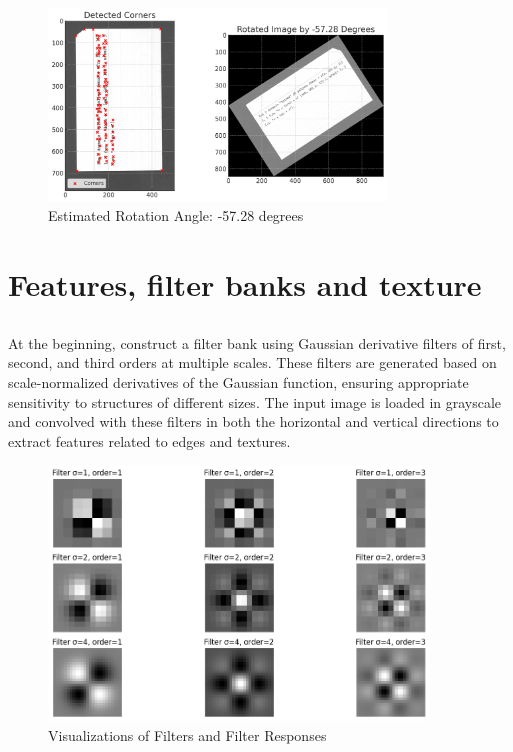 \documentclass[12pt]{article}
\begin{document}

\begin{figure}[h]
    \centering
    \includegraphics[width=0.8\textwidth]{pics/a6-2.1.png} 
    \caption{Estimated Rotation Angle: -57.28 degrees}
    \label{rot}
\end{figure}


\section{Features, filter banks and texture}
    \subsection{}
At the beginning, construct a filter bank using Gaussian derivative filters of first, second, and third orders at multiple scales. These filters are generated based on scale-normalized derivatives of the Gaussian function, ensuring appropriate sensitivity to structures of different sizes. The input image is loaded in grayscale and convolved with these filters in both the horizontal and vertical directions to extract features related to edges and textures.
\begin{figure}[h]
    \centering
    \includegraphics[width=0.9\textwidth]{pics/a6-3.1-1.png}
    \caption{Visualizations of Filters and Filter Responses}
    \label{3.1-1}
\end{figure}
\end{document}
